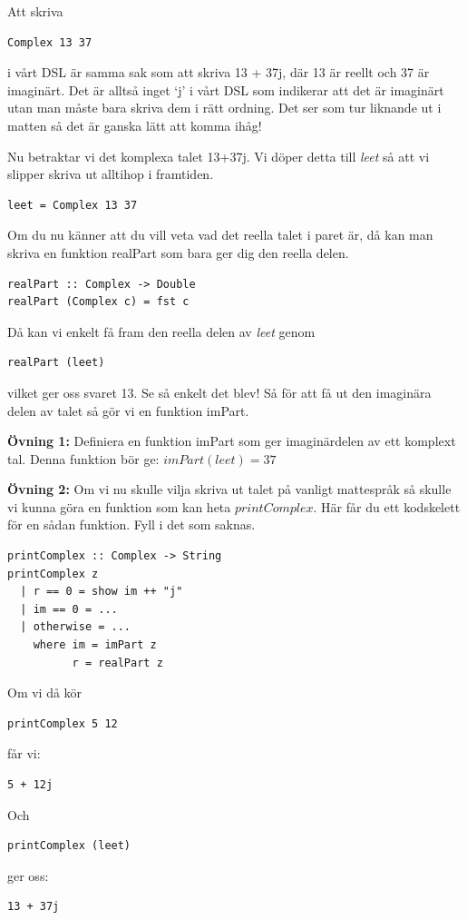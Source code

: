 \documentclass{article}
\begin{document}
Att skriva
\begin{verbatim}
Complex 13 37
\end{verbatim} 
i vårt DSL är samma sak som att skriva 13 + 37j, där 13 är reellt och 37 är imaginärt. Det är alltså inget ‘j’ i vårt DSL som indikerar att det är imaginärt utan man måste bara skriva dem i rätt ordning. Det ser som tur liknande ut i matten så det är ganska lätt att komma ihåg! %

Nu betraktar vi det komplexa talet 13+37j. Vi döper detta till \emph{leet} så att vi slipper skriva ut alltihop i framtiden. \\
\begin{verbatim}
leet = Complex 13 37
\end{verbatim}
Om du nu känner att du vill veta vad det reella talet i paret är, då kan man skriva en funktion realPart som bara ger dig den reella delen. \\
\begin{verbatim}
realPart :: Complex -> Double 
realPart (Complex c) = fst c 
\end{verbatim}
Då kan vi enkelt få fram den reella delen av \emph{leet} genom\\
\begin{verbatim}
realPart (leet) 
\end{verbatim}
vilket ger oss svaret 13.
Se så enkelt det blev! 
Så för att få ut den imaginära delen av talet så gör vi en funktion imPart. 

\textbf{Övning 1:} Definiera en funktion imPart som ger imaginärdelen av ett komplext tal.
Denna funktion bör ge: $imPart (leet) = 37$

\textbf{Övning 2:} Om vi nu skulle vilja skriva ut talet på vanligt mattespråk så skulle vi kunna göra en funktion som kan heta $printComplex$. Här får du ett kodskelett för en sådan funktion. Fyll i det som saknas.
\begin{verbatim}
printComplex :: Complex -> String
printComplex z
  | r == 0 = show im ++ "j"
  | im == 0 = ...
  | otherwise = ...
    where im = imPart z
          r = realPart z
\end{verbatim}
Om vi då kör 
\begin{verbatim}
printComplex 5 12
\end{verbatim}
får vi:
\begin{verbatim}
5 + 12j
\end{verbatim}
Och
\begin{verbatim}
printComplex (leet) 
\end{verbatim}
ger oss:
\begin{verbatim}
13 + 37j
\end{verbatim}
\end{document}
